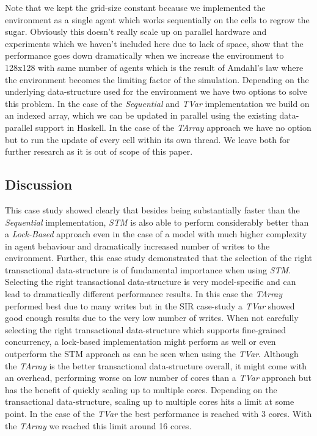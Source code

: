 Note that we kept the grid-size constant because we implemented the environment as a single agent which works sequentially on the cells to regrow the sugar. Obviously this doesn't really scale up on parallel hardware and experiments which we haven't included here due to lack of space, show that the performance goes down dramatically when we increase the environment to 128x128 with same number of agents which is the result of Amdahl's law where the environment becomes the limiting factor of the simulation. Depending on the underlying data-structure used for the environment we have two options to solve this problem. In the case of the \textit{Sequential} and \textit{TVar} implementation we build on an indexed array, which we can be updated in parallel using the existing data-parallel support in Haskell. In the case of the \textit{TArray} approach we have no option but to run the update of every cell within its own thread. We leave both for further research as it is out of scope of this paper.

\subsection{Discussion}
This case study showed clearly that besides being substantially faster than the \textit{Sequential} implementation, \textit{STM} is also able to perform considerably better than a \textit{Lock-Based} approach even in the case of a model with much higher complexity in agent behaviour and dramatically increased number of writes to the environment.
Further, this case study demonstrated that the selection of the right transactional data-structure is of fundamental importance when using \textit{STM}. Selecting the right transactional data-structure is very model-specific and can lead to dramatically different performance results.
In this case the \textit{TArray} performed best due to many writes but in the SIR case-study a \textit{TVar} showed good enough results due to the very low number of writes. When not carefully selecting the right transactional data-structure which supports fine-grained concurrency, a lock-based implementation might perform as well or even outperform the STM approach as can be seen when using the \textit{TVar}.
Although the \textit{TArray} is the better transactional data-structure overall, it might come with an overhead, performing worse on low number of cores than a \textit{TVar} approach but has the benefit of quickly scaling up to multiple cores. Depending on the transactional data-structure, scaling up to multiple cores hits a limit at some point. In the case of the \textit{TVar} the best performance is reached with 3 cores. With the \textit{TArray} we reached this limit around 16 cores.


